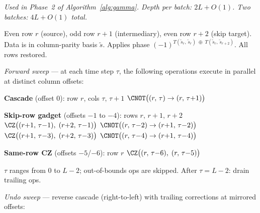 \emph{Used in Phase~2 of Algorithm~\ref{alg:gamma}. Depth per batch: $2L + O(1)$. Two batches: $4L + O(1)$ total.}


\begin{algorithm}[t]
\caption{\textsc{PipelineSameSkip}: same-row $T(x,x)$ + skip-row $T(x,y)$ in one sweep}
\label{alg:pipeline-a}
\begin{algorithmic}[1]
\Input Even row $r$ (source), odd row $r{+}1$ (intermediary), even row $r{+}2$ (skip target).
  Data is in column-parity basis $\tilde{s}$.
\Output Applies phase $(-1)^{T(\tilde{s}_r,\,\tilde{s}_r) \;\oplus\; T(\tilde{s}_r,\,\tilde{s}_{r+2})}$.
  All rows restored.

\Statex
\Statex \emph{Forward sweep} --- at each time step $\tau$, the following
\Statex \hspace{1em} operations execute in parallel at distinct column offsets:

\Statex \hspace{2em}\textbf{Cascade} (offset 0): \hfill row $r$, cols $\tau{,}\,\tau{+}1$
\State \hspace{3em}$\CNOT\bigl((r,\,\tau) \to (r,\,\tau{+}1)\bigr)$

\Statex \hspace{2em}\textbf{Skip-row gadget} (offsets $-1$ to $-4$): \hfill rows $r{,}\,r{+}1{,}\,r{+}2$
\State \hspace{3em}$\CZ\bigl((r{+}1,\,\tau{-}1),\;(r{+}2,\,\tau{-}1)\bigr)$
\State \hspace{3em}$\CNOT\bigl((r,\,\tau{-}2) \to (r{+}1,\,\tau{-}2)\bigr)$
\State \hspace{3em}$\CZ\bigl((r{+}1,\,\tau{-}3),\;(r{+}2,\,\tau{-}3)\bigr)$
\State \hspace{3em}$\CNOT\bigl((r,\,\tau{-}4) \to (r{+}1,\,\tau{-}4)\bigr)$

\Statex \hspace{2em}\textbf{Same-row CZ} (offsets $-5$/$-6$): \hfill row $r$
\State \hspace{3em}$\CZ\bigl((r,\,\tau{-}6),\;(r,\,\tau{-}5)\bigr)$

\Statex
\State $\tau$ ranges from $0$ to $L{-}2$; out-of-bounds ops are skipped.
\State After $\tau = L{-}2$: drain trailing ops.

\Statex
\Statex \emph{Undo sweep} --- reverse cascade (right-to-left) with trailing
\Statex \hspace{1em} corrections at mirrored offsets:


\end{algorithmic}
\end{algorithm}
